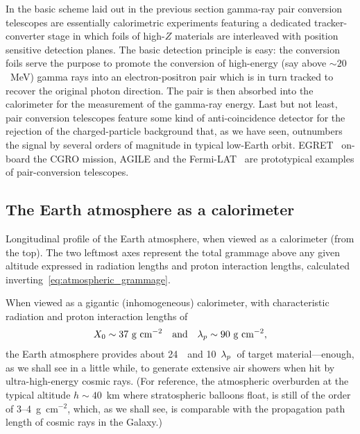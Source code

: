 In the basic scheme laid out in the previous section gamma-ray pair conversion
telescopes are essentially calorimetric experiments featuring a dedicated
tracker-converter stage in which foils of high-$Z$ materials are interleaved
with position sensitive detection planes. The basic detection principle is
easy: the conversion foils serve the purpose to promote the conversion of
high-energy (say above $\sim 20$~MeV) gamma rays into an electron-positron pair
which is in turn tracked to recover the original photon direction.
The pair is then absorbed into the calorimeter for the measurement of the
gamma-ray energy. Last but not least, pair conversion telescopes feature some
kind of anti-coincidence detector for the rejection of the charged-particle
background that, as we have seen, outnumbers the signal by several orders of
magnitude in typical low-Earth orbit. EGRET~\cite{1988SSRv...49...69K} on-board
the CGRO mission, AGILE and the Fermi-LAT~\cite{2009ApJ...697.1071A} are
prototypical examples of pair-conversion telescopes.



\subsection{The Earth atmosphere as a calorimeter}

\begin{marginfigure}
  
  \caption{Longitudinal profile of the Earth atmosphere, when viewed as a
  calorimeter (from the top). The two leftmost axes represent the total grammage
  above any given altitude expressed in radiation lengths and proton
  interaction lengths, calculated inverting~\eqref{eq:atmospheric_grammage}.}
  \label{fig:atmospheric_scales}
\end{marginfigure}

When viewed as a gigantic (inhomogeneous) calorimeter, with characteristic
radiation and proton interaction lengths of
\begin{align*}
  X_0 \sim 37~\text{g~cm}^{-2}
  \quad\text{and}\quad
  \lambda_p \sim 90~\text{g~cm}^{-2},
\end{align*}
the Earth atmosphere provides about 24~\radlength~and 10~$\lambda_p$~of target
material---enough, as we shall see in a little while, to generate extensive air
showers when hit by ultra-high-energy cosmic rays.
(For reference, the atmospheric overburden at the typical altitude $h \sim 40$~km
where stratospheric balloons float, is still of the order of 3--4~g~cm$^{-2}$, which,
as we shall see, is comparable with the propagation path length of cosmic rays in
the Galaxy.)


